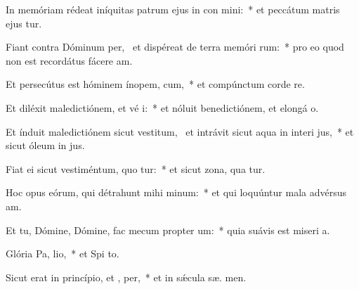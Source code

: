 \item In memóriam rédeat iníquitas patrum ejus in con mini:~* et peccátum matris ejus  tur.
\item Fiant contra Dóminum per,~\pscross{} et dispéreat de terra memóri rum:~* pro eo quod non est recordátus fácere am.
\item Et persecútus est hóminem ínopem,  cum,~* et compúnctum corde re.
\item Et diléxit maledictiónem, et vé i:~* et nóluit benedictiónem, et elongá  o.
\item Et índuit maledictiónem sicut vestitum,~\pscross{} et intrávit sicut aqua in interi jus,~* et sicut óleum in  jus.
\item Fiat ei sicut vestiméntum, quo tur:~* et sicut zona, qua  tur.
\item Hoc opus eórum, qui détrahunt mihi  minum:~* et qui loquúntur mala advérsus  am.
\item Et tu, Dómine, Dómine, fac mecum propter  um:~* quia suávis est miseri a.
\item Glória Pa,  lio,~* et Spi to.
\item Sicut erat in princípio, et ,  per,~* et in sǽcula sæ. men.
